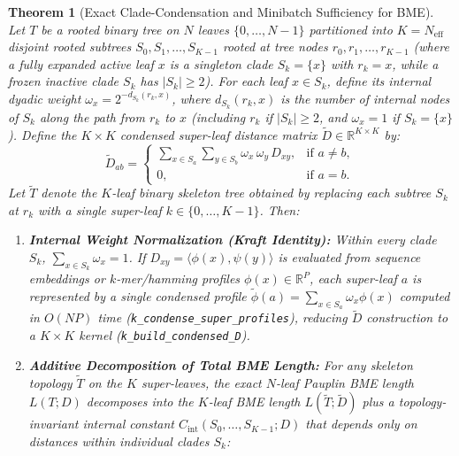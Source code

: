 \documentclass[11pt,a4paper]{article}
\newtheorem{theorem}{Theorem}[section]
\theoremstyle{definition}
\begin{document}
\begin{theorem}[Exact Clade-Condensation and Minibatch Sufficiency for BME]
\label{thm:clade_condense}
Let $T$ be a rooted binary tree on $N$ leaves $\{0, \dots, N-1\}$ partitioned into $K = N_{\text{eff}}$ disjoint rooted subtrees $S_0, S_1, \dots, S_{K-1}$ rooted at tree nodes $r_0, r_1, \dots, r_{K-1}$ (where a fully expanded active leaf $x$ is a singleton clade $S_k = \{x\}$ with $r_k = x$, while a frozen inactive clade $S_k$ has $|S_k| \ge 2$). For each leaf $x \in S_k$, define its internal dyadic weight $\omega_x = 2^{-d_{S_k}(r_k, x)}$, where $d_{S_k}(r_k, x)$ is the number of internal nodes of $S_k$ along the path from $r_k$ to $x$ (including $r_k$ if $|S_k| \ge 2$, and $\omega_x = 1$ if $S_k = \{x\}$). Define the $K \times K$ condensed super-leaf distance matrix $\widetilde{D} \in \mathbb{R}^{K \times K}$ by:
\begin{equation}
\widetilde{D}_{ab} = \begin{cases}
\displaystyle \sum_{x \in S_a} \sum_{y \in S_b} \omega_x \, \omega_y \, D_{xy}, & \text{if } a \neq b, \\[10pt]
0, & \text{if } a = b.
\end{cases}
\label{eq:condensed_D}
\end{equation}
Let $\widetilde{T}$ denote the $K$-leaf binary skeleton tree obtained by replacing each subtree $S_k$ at $r_k$ with a single super-leaf $k \in \{0, \dots, K-1\}$. Then:
\begin{enumerate}
    \item \textbf{Internal Weight Normalization (Kraft Identity):} Within every clade $S_k$, $\sum_{x \in S_k} \omega_x = 1$. If $D_{xy} = \langle \phi(x), \psi(y) \rangle$ is evaluated from sequence embeddings or $k$-mer/hamming profiles $\phi(x) \in \mathbb{R}^P$, each super-leaf $a$ is represented by a single condensed profile $\widetilde{\phi}(a) = \sum_{x \in S_a} \omega_x \phi(x)$ computed in $O(N P)$ time (\texttt{k\_condense\_super\_profiles}), reducing $\widetilde{D}$ construction to a $K \times K$ kernel (\texttt{k\_build\_condensed\_D}).
    \item \textbf{Additive Decomposition of Total BME Length:} For any skeleton topology $\widetilde{T}$ on the $K$ super-leaves, the exact $N$-leaf Pauplin BME length $L(T; D)$ decomposes into the $K$-leaf BME length $L(\widetilde{T}; \widetilde{D})$ plus a topology-invariant internal constant $C_{\text{int}}(S_0, \dots, S_{K-1}; D)$ that depends only on distances within individual clades $S_k$:
    \begin{equation}

\end{equation}
\end{enumerate}
\end{theorem}
\end{document}
